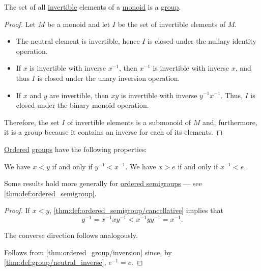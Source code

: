 \begin{proposition}\label{thm:invertible_submonoid_is_group}
  The set of all \hyperref[def:monoid_inverse]{invertible} elements of a \hyperref[def:monoid]{monoid} is a \hyperref[def:group]{group}.
\end{proposition}
\begin{proof}
  Let \( M \) be a monoid and let \( I \) be the set of invertible elements of \( M \).

  \begin{itemize}
    \item The neutral element is invertible, hence \( I \) is closed under the nullary identity operation.
    \item If \( x \) is invertible with inverse \( x^{-1} \), then \( x^{-1} \) is invertible with inverse \( x \), and thus \( I \) is closed under the unary inversion operation.
    \item If \( x \) and \( y \) are invertible, then \( xy \) is invertible with inverse \( y^{-1} x^{-1} \). Thus, \( I \) is closed under the binary monoid operation.
  \end{itemize}

  Therefore, the set \( I \) of invertible elements is a submonoid of \( M \) and, furthermore, it is a group because it contains an inverse for each of its elements.
\end{proof}

\begin{proposition}\label{thm:ordered_group}
  \hyperref[def:ordered_semiring]{Ordered} \hyperref[def:group]{groups} have the following properties:
  \begin{thmenum}
     We have \( x < y \) if and only if \( y^{-1} < x^{-1} \).
     We have \( x > e \) if and only if \( x^{-1} < e \).
  \end{thmenum}
\end{proposition}
\begin{comments}
  \item Some results hold more generally for \hyperref[def:ordered_semigroup]{ordered semigroups} --- see \cref{thm:def:ordered_semigroup}.
\end{comments}
\begin{proof}
   If \( x < y \), \cref{thm:def:ordered_semigroup/cancellative} implies that
  \begin{equation*}
    y^{-1} = x^{-1} x y^{-1} < x^{-1} y y^{-1} = x^{-1}.
  \end{equation*}

  The converse direction follows analogously.

   Follows from \cref{thm:ordered_group/inversion} since, by \cref{thm:def:group/neutral_inverse}, \( e^{-1} = e \).
\end{proof}

